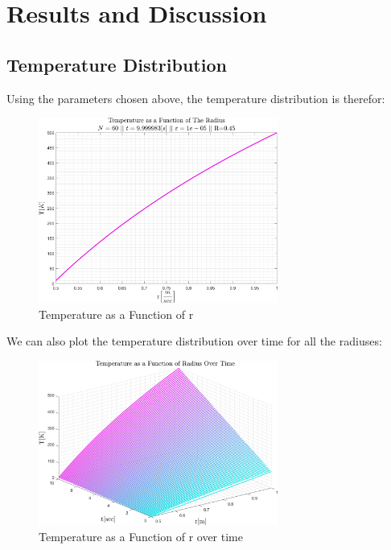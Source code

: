 \documentclass[11pt, a4paper]{article}
\begin{document}
\newpage
\section{Results and Discussion}
\subsection{Temperature Distribution}
Using the parameters chosen above, the temperature distribution is therefor:
\begin{figure}[H]
    \centering
    \includegraphics[width=0.7\textwidth]{images/T over r.png}
    \caption{Temperature as a Function of r}
    \label{fig: T vs r}
\end{figure}
We can also plot the temperature distribution over time for all the radiuses:
\begin{figure}[H]
    \centering
    \includegraphics[width=0.7\textwidth]{images/T vs r vs t.png}
    \caption{Temperature as a Function of r over time}
    \label{fig: T vs r vs t}
\end{figure}

\newpage
\end{document}
